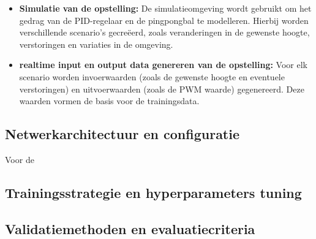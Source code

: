 \begin{itemize}
  \item \textbf{Simulatie van de opstelling:} De simulatieomgeving wordt gebruikt om het gedrag van de PID-regelaar en de pingpongbal te modelleren. Hierbij worden verschillende scenario's gecreëerd, zoals veranderingen in de gewenste hoogte, verstoringen en variaties in de omgeving.
  \item \textbf{realtime input en output data genereren van de opstelling:} Voor elk scenario worden invoerwaarden (zoals de gewenste hoogte en eventuele verstoringen) en uitvoerwaarden (zoals de PWM waarde) gegenereerd. Deze waarden vormen de basis voor de trainingsdata.
\end{itemize}

\subsection{Netwerkarchitectuur en configuratie}
Voor de 

\subsection{Trainingsstrategie en hyperparameters tuning}

\subsection{Validatiemethoden en evaluatiecriteria}


